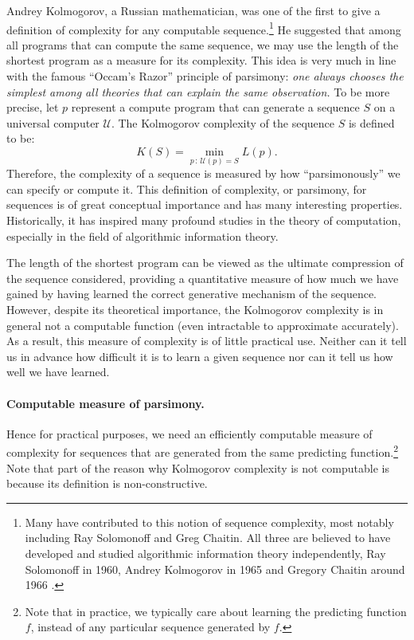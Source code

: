 \documentclass[../../book-main.tex]{subfiles}
\begin{document}
Andrey Kolmogorov, a Russian mathematician, was one of the first to give a definition of complexity for any computable sequence.\footnote{Many have contributed to this notion of sequence complexity, most notably including Ray Solomonoff and Greg Chaitin. All three are believed to have developed and studied algorithmic information theory independently, Ray Solomonoff in 1960, Andrey Kolmogorov in 1965 \cite{Kolmogorov1998OnTO} and Gregory Chaitin around 1966 \cite{Chaitin-1966}.} He suggested that among all programs that can compute the same sequence, we may use the length of the shortest program as a measure for its complexity. This idea is very much in line with the famous ``Occam's Razor'' principle of parsimony: {\em one always chooses the simplest among all theories that can explain the same observation.} To be more precise, let $p$ represent a compute program that can generate a sequence $S$ on a universal computer $\mathcal{U}$. The  Kolmogorov complexity of the sequence $S$ is defined to be:
\begin{equation}
    K(S) = \min_{p\,:\, \mathcal{U}(p) = S} L(p). 
\end{equation}
Therefore, the complexity of a sequence is measured by how ``parsimonously'' we can specify or compute it. This definition of complexity, or parsimony, for sequences is of great conceptual importance and has many interesting properties. Historically, it has inspired many profound studies in the theory of computation, especially in the field of algorithmic information theory.

The length of the shortest program can be viewed as the ultimate compression of the sequence considered, providing a quantitative measure of how much we have gained by having learned the correct generative mechanism of the sequence. However, despite its theoretical importance, the Kolmogorov complexity is in general not a computable function \cite{Cover-Thomas} (even  intractable to approximate accurately). As a result, this measure of complexity is of little practical use. Neither can it tell us in advance how difficult it is to learn a given sequence nor can it tell us how well we have learned.






\paragraph{Computable measure of parsimony.}
Hence for practical purposes, we need an efficiently computable measure of complexity for sequences that are generated from the same predicting function.\footnote{Note that in practice, we typically care about learning the predicting function $f$, instead of any particular sequence generated by $f$.} Note that part of the reason why Kolmogorov complexity is not computable is because its definition is non-constructive.
\end{document}
